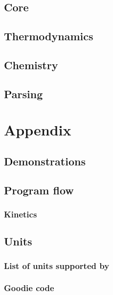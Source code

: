 \documentclass[twoside]{report}
\begin{document}
\chapter{Core}

\chapter{Thermodynamics}

\chapter{Chemistry}



\chapter{Parsing}

\appendix
\part{Appendix}
\chapter{Demonstrations}
\label{demo}


\chapter{Program flow}
\label{progflow}

\section{Kinetics}
\label{progflow:kinetics}


\chapter{Units}
\section{List of units supported by \Antioch}
\label{list_units}


\section{Goodie code}
\label{unit_goodie}
{\footnotesize

}
\end{document}
